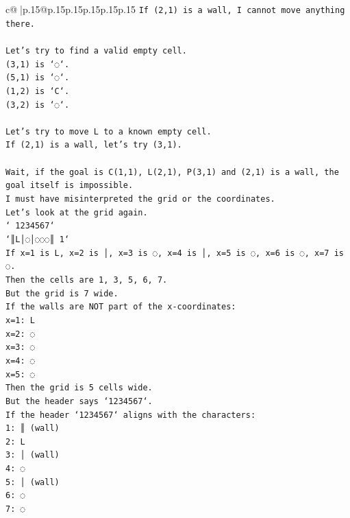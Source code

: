 \documentclass{article}
\begin{document}
{\begin{supertabular}{c@{$\;$}|p{.15\linewidth}@{}p{.15\linewidth}p{.15\linewidth}p{.15\linewidth}p{.15\linewidth}p{.15\linewidth}}
{{{\texttt{If (2,1) is a wall, I cannot move anything there.} \\
\\ 
\texttt{Let's try to find a valid empty cell.} \\
\texttt{(3,1) is `◌`.} \\
\texttt{(5,1) is `◌`.} \\
\texttt{(1,2) is `C`.} \\
\texttt{(3,2) is `◌`.} \\
\\ 
\texttt{Let's try to move L to a known empty cell.} \\
\texttt{If (2,1) is a wall, let's try (3,1).} \\
\\ 
\texttt{Wait, if the goal is C(1,1), L(2,1), P(3,1) and (2,1) is a wall, the goal itself is impossible.} \\
\texttt{I must have misinterpreted the grid or the coordinates.} \\
\texttt{Let's look at the grid again.} \\
\texttt{` 1234567`} \\
\texttt{`║L│◌│◌◌◌║ 1`} \\
\texttt{If x=1 is L, x=2 is │, x=3 is ◌, x=4 is │, x=5 is ◌, x=6 is ◌, x=7 is ◌.} \\
\texttt{Then the cells are 1, 3, 5, 6, 7.} \\
\texttt{But the grid is 7 wide.} \\
\texttt{If the walls are NOT part of the x{-}coordinates:} \\
\texttt{x=1: L} \\
\texttt{x=2: ◌} \\
\texttt{x=3: ◌} \\
\texttt{x=4: ◌} \\
\texttt{x=5: ◌} \\
\texttt{Then the grid is 5 cells wide.} \\
\texttt{But the header says `1234567`.} \\
\texttt{If the header `1234567` aligns with the characters:} \\
\texttt{1: ║ (wall)} \\
\texttt{2: L} \\
\texttt{3: │ (wall)} \\
\texttt{4: ◌} \\
\texttt{5: │ (wall)} \\
\texttt{6: ◌} \\
\texttt{7: ◌} \\
}}}
\end{supertabular}}
\end{document}
